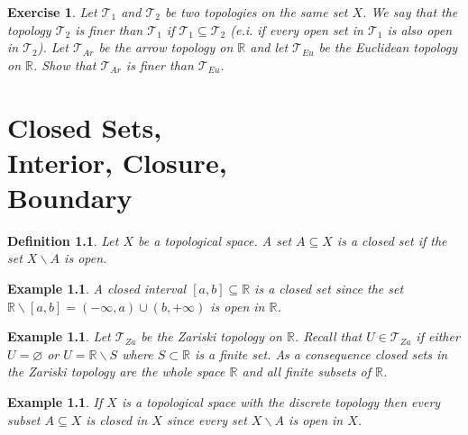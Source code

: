 \documentclass[11pt, letterpaper, oneside]{report}
\theoremstyle{pplain}
\newtheorem{ITERMVALUE THM}[theorem]{Intermediate Value Theorem}
\newtheorem{HEINEBOREL THM}[theorem]{Heine-Borel Theorem}
\newtheorem{UMETR THM}[theorem]{Urysohn Metrization Theorem}
\newtheorem{UMETR2 THM}[theorem]{Urysohn Metrization Theorem (v.2)}
\theoremstyle{ddefinition}
\newtheorem{definition}[theorem]{Definition}
\newtheorem{example}[theorem]{Example}
\theoremstyle{nnn}
\newtheorem{TDA NN}[theorem]{Topological Data Analysis. }
\theoremstyle{eexercise}
\newtheorem{exercise}{Exercise}[chapter]
\newcommand{\R}{{\mathbb R}}
\newcommand{\TT}{{\mathcal T}}
\newcommand{\ssmin}{\smallsetminus}
\begin{document}
\begin{exercise}
Let $\TT_{1}$ and $\TT_{2}$ be two topologies on the same set $X$. We say that the topology 
$\TT_{2}$ is \emph{finer} than $\TT_{1}$ if $\TT_{1}\subseteq \TT_{2}$ 
(e.i. if every open set in $\TT_{1}$ is also open in $\TT_{2}$). Let $\TT_{Ar}$ be the arrow 
topology on $\R$ and let $\TT_{Eu}$ be the Euclidean topology on $\R$. Show that 
$\TT_{Ar}$ is finer than $\TT_{Eu}$.
\end{exercise}





\newpage

\chapter[Closed Sets]{Closed Sets, \\ Interior, Closure, \\ Boundary}

\thispagestyle{firststyle}

\begin{definition}
\label{CLOSED SET DEF}
Let $X$ be a topological space. A set $A\subseteq X$ is a \emph{closed set} if the 
set $X\ssmin A$ is open.
\end{definition}

\begin{example}
A closed interval $[a, b]\subseteq \R$ is a closed set since the set 
$\R\ssmin [a, b] = (-\infty, a)\cup (b, +\infty)$
is open in $\R$.
\end{example}

\begin{example}
Let $\TT_{Za}$ be the Zariski topology on $\R$. Recall that $U\in \TT_{Za}$ if 
either $U = \varnothing$ or $U = \R\ssmin S$ where $S\subset \R$ is a finite set. 
As a consequence closed sets in the Zariski topology are the whole space $\R$ and 
all finite subsets of $\R$.
\end{example}

\begin{example}
If $X$ is a topological space with the discrete topology then every subset $A\subseteq X$
is closed in $X$ since every set $X\ssmin A$ is open in $X$. 
\end{example}
\end{document}
